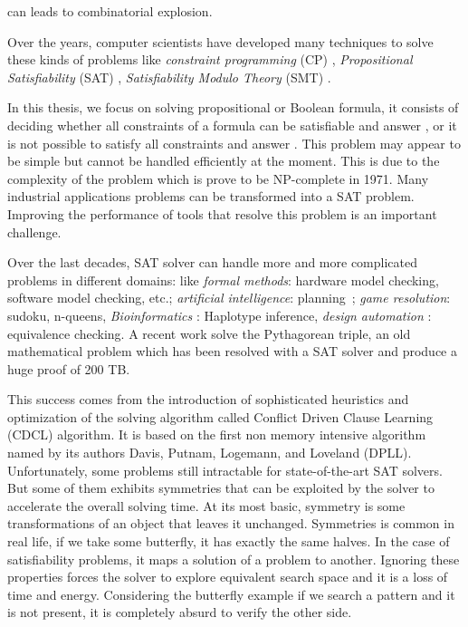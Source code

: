  can leads to combinatorial explosion.
 
 
Over the years, computer scientists have developed many techniques to solve 
these kinds of problems like \emph{constraint programming} (CP) \cite{rossi2006handbook},
\emph{Propositional Satisfiability} (SAT) \cite{biere2009handbook},
\emph{Satisfiability Modulo Theory} (SMT) \cite{barrett2018satisfiability}.



In this thesis, we focus on solving propositional or Boolean formula, it consists of deciding whether 
all constraints of a formula can be satisfiable and answer \sat, or it is not possible to satisfy all
constraints and answer \unsat.
This problem may appear to be simple but cannot be handled efficiently
at the moment. This is due to the complexity of the problem which is prove to be NP-complete in 1971. 
Many industrial applications problems can be transformed into a SAT problem.
Improving the performance of tools that resolve this problem is an important challenge. 

Over the last decades, SAT solver can handle more and more complicated problems in different domains:
like \emph{formal methods}: hardware model checking,
software model checking, etc.; \emph{artificial intelligence}: planning~\cite{planning_92}; \emph{game resolution}:
sudoku, n-queens, \emph{Bioinformatics} : Haplotype inference,
\emph{design automation} : equivalence checking.
A recent work solve the Pythagorean triple, an old mathematical problem which has been resolved with 
a SAT solver and produce a huge proof of 200 TB.
 
This success comes from the introduction of sophisticated heuristics and optimization of the solving 
algorithm called Conflict Driven Clause Learning (CDCL) algorithm. It is based on the first non memory
intensive algorithm named by its authors Davis, Putnam, Logemann, and Loveland (DPLL).
Unfortunately, some problems still intractable for state-of-the-art SAT solvers. But some 
of them exhibits symmetries that can be exploited by the solver to accelerate the overall solving time.
At its most basic, symmetry is some transformations of an object that leaves it unchanged.
Symmetries is common in real life, if we take some butterfly, it has exactly the same halves.
In the case of satisfiability problems, it maps a solution of a problem to another.
Ignoring these properties forces the solver to explore equivalent search space and it is a loss of
time and energy. Considering the butterfly example if we search a pattern and it is not present, it is
completely absurd to verify the other side. 

